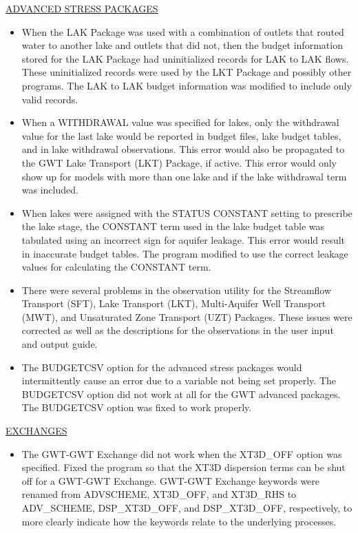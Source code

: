 \documentclass[11pt,twoside,twocolumn]{usgsreport}
\begin{document}
\begin{itemize}
	\underline{ADVANCED STRESS PACKAGES}
	\begin{itemize}
		\item When the LAK Package was used with a combination of outlets that routed water to another lake and outlets that did not, then the budget information stored for the LAK Package had uninitialized records for LAK to LAK flows.  These uninitialized records were used by the LKT Package and possibly other programs.  The LAK to LAK budget information was modified to include only valid records.
		\item When a WITHDRAWAL value was specified for lakes, only the withdrawal value for the last lake would be reported in budget files, lake budget tables, and in lake withdrawal observations.  This error would also be propagated to the GWT Lake Transport (LKT) Package, if active.  This error would only show up for models with more than one lake and if the lake withdrawal term was included.
		\item When lakes were assigned with the STATUS CONSTANT setting to prescribe the lake stage, the CONSTANT term used in the lake budget table was tabulated using an incorrect sign for aquifer leakage.  This error would result in inaccurate budget tables.  The program modified to use the correct leakage values for calculating the CONSTANT term.
		\item There were several problems in the observation utility for the Streamflow Transport (SFT), Lake Transport (LKT), Multi-Aquifer Well Transport (MWT), and Unsaturated Zone Transport (UZT) Packages.  These issues were corrected as well as the descriptions for the observations in the user input and output guide.
		\item The BUDGETCSV option for the advanced stress packages would intermittently cause an error due to a variable not being set properly.  The BUDGETCSV option did not work at all for the GWT advanced packages.  The BUDGETCSV option was fixed to work properly.
	\end{itemize}


	\underline{EXCHANGES}
	\begin{itemize}
		\item The GWT-GWT Exchange did not work when the XT3D\_OFF option was specified.  Fixed the program so that the XT3D dispersion terms can be shut off for a GWT-GWT Exchange.  GWT-GWT Exchange keywords were renamed from ADVSCHEME, XT3D\_OFF, and XT3D\_RHS to ADV\_SCHEME, DSP\_XT3D\_OFF, and DSP\_XT3D\_OFF, respectively, to more clearly indicate how the keywords relate to the underlying processes.  
	\end{itemize}

	
\end{itemize}
\end{document}
